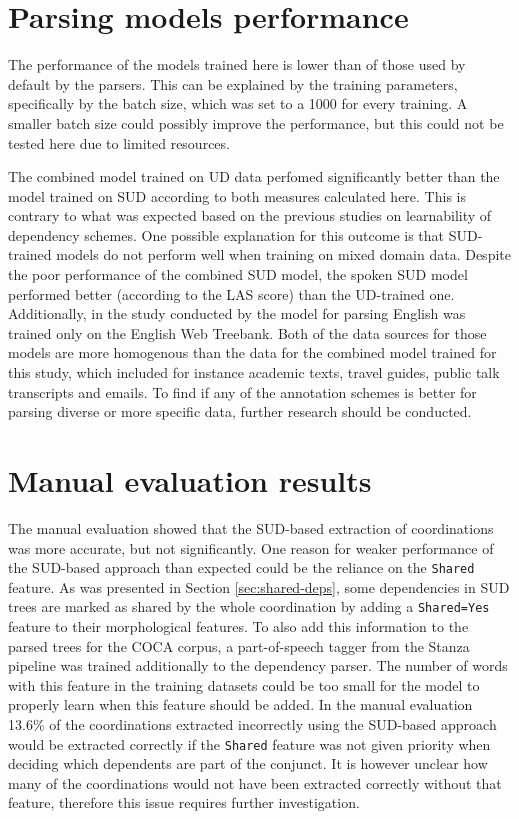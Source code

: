 \section{Parsing models performance}

The performance of the models trained here is lower than of those used by default by the parsers. This can be explained by the training parameters, specifically by the batch size, which was set to a 1000 for every training. A smaller batch size could possibly improve the performance, but this could not be tested here due to limited resources.

The combined model trained on UD data perfomed significantly better than the model trained on SUD according to both measures calculated here. This is contrary to what was expected based on the previous studies on learnability of dependency schemes. One possible explanation for this outcome is that SUD-trained models do not perform well when training on mixed domain data. Despite the poor performance of the combined SUD model, the spoken SUD model performed better (according to the LAS score) than the UD-trained one. Additionally, in the study conducted by \cite{tuo:prz:lac:21} the model for parsing English was trained only on the English Web Treebank. Both of the data sources for those models are more homogenous than the data for the combined model trained for this study, which included for instance academic texts, travel guides, public talk transcripts and emails. To find if any of the annotation schemes is better for parsing diverse or more specific data, further research should be conducted.

\section{Manual evaluation results}

The manual evaluation showed that the SUD-based extraction of coordinations was more accurate, but not significantly. One reason for weaker performance of the SUD-based approach than expected could be the reliance on the \texttt{Shared} feature. As was presented in Section \ref{sec:shared-deps}, some dependencies in SUD trees are marked as shared by the whole coordination by adding a \texttt{Shared=Yes} feature to their morphological features. To also add this information to the parsed trees for the COCA corpus, a part-of-speech tagger from the Stanza pipeline was trained additionally to the dependency parser. The number of words with this feature in the training datasets could be too small for the model to properly learn when this feature should be added. In the manual evaluation 13.6\% of the coordinations extracted incorrectly using the SUD-based approach would be extracted correctly if the \texttt{Shared} feature was not given priority when deciding which dependents are part of the conjunct. It is however unclear how many of the coordinations would not have been extracted correctly without that feature, therefore this issue requires further investigation. 

